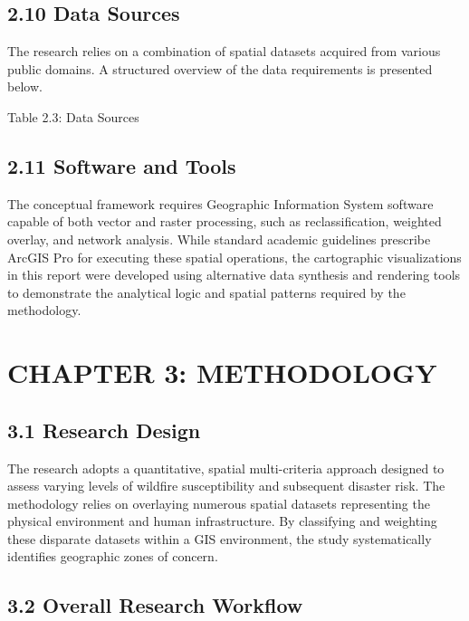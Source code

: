 \documentclass[12pt,a4paper]{article}
\begin{document}
\subsection*{2.10 Data Sources}

The research relies on a combination of spatial datasets acquired from various public domains. A structured overview of the data requirements is presented below.


Table 2.3: Data Sources



\subsection*{2.11 Software and Tools}

The conceptual framework requires Geographic Information System software capable of both vector and raster processing, such as reclassification, weighted overlay, and network analysis. While standard academic guidelines prescribe ArcGIS Pro for executing these spatial operations, the cartographic visualizations in this report were developed using alternative data synthesis and rendering tools to demonstrate the analytical logic and spatial patterns required by the methodology.



\clearpage
\section*{CHAPTER 3: METHODOLOGY}


\subsection*{3.1 Research Design}

The research adopts a quantitative, spatial multi-criteria approach designed to assess varying levels of wildfire susceptibility and subsequent disaster risk. The methodology relies on overlaying numerous spatial datasets representing the physical environment and human infrastructure. By classifying and weighting these disparate datasets within a GIS environment, the study systematically identifies geographic zones of concern.



\subsection*{3.2 Overall Research Workflow}
\end{document}
